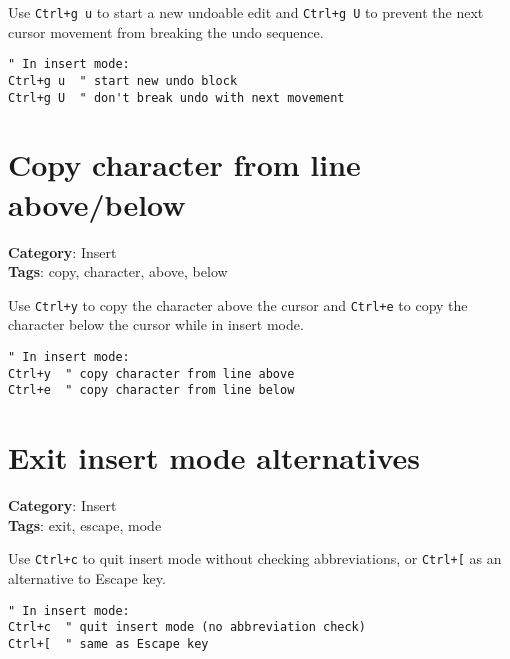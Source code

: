 {{{{{{Use {\footnotesize \Verb§Ctrl+g u§} to start a new undoable edit and {\footnotesize \Verb§Ctrl+g U§} to prevent the next cursor movement from breaking the undo sequence.

\begin{Exa*}{}
\begin{Verbatim}[fontsize=\footnotesize, breaklines, breakanywhere]
" In insert mode:
Ctrl+g u  " start new undo block
Ctrl+g U  " don't break undo with next movement
\end{Verbatim}
\end{Exa*}

\section{Copy character from line above/below}

\textbf{Category}: Insert\\ \textbf{Tags}: copy, character, above, below
\vspace{0.5cm}

Use {\footnotesize \Verb§Ctrl+y§} to copy the character above the cursor and {\footnotesize \Verb§Ctrl+e§} to copy the character below the cursor while in insert mode.

\begin{Exa*}{}
\begin{Verbatim}[fontsize=\footnotesize, breaklines, breakanywhere]
" In insert mode:
Ctrl+y  " copy character from line above
Ctrl+e  " copy character from line below
\end{Verbatim}
\end{Exa*}

\section{Exit insert mode alternatives}

\textbf{Category}: Insert\\ \textbf{Tags}: exit, escape, mode
\vspace{0.5cm}

Use {\footnotesize \Verb§Ctrl+c§} to quit insert mode without checking abbreviations, or {\footnotesize \Verb§Ctrl+[§} as an alternative to Escape key.

\begin{Exa*}{}
\begin{Verbatim}[fontsize=\footnotesize, breaklines, breakanywhere]
" In insert mode:
Ctrl+c  " quit insert mode (no abbreviation check)
Ctrl+[  " same as Escape key
\end{Verbatim}
\end{Exa*}

}}}}}}
